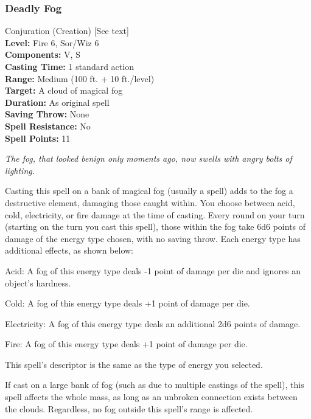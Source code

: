 \subsubsection{Deadly Fog}
\label{Spell:DeadlyFog}
Conjuration (Creation) [See text]
\\ \textbf{Level:} Fire 6, Sor/Wiz 6
\\ \textbf{Components:} V, S
\\ \textbf{Casting Time:} 1 standard action
\\ \textbf{Range:} Medium (100 ft. + 10 ft./level)
\\ \textbf{Target:} A cloud of magical fog
\\ \textbf{Duration:} As original spell
\\ \textbf{Saving Throw:} None
\\ \textbf{Spell Resistance:} No
\\ \textbf{Spell Points:} 11

\emph{The fog, that looked benign only moments ago, now swells with angry bolts of lighting.}

Casting this spell on a bank of magical fog (usually a  spell) adds to the fog a destructive element, damaging those caught within.
You choose between acid, cold, electricity, or fire damage at the time of casting. 
Every round on your turn (starting on the turn you cast this spell), 
those within the fog take 6d6 points of damage of the energy type chosen, with no saving throw.
Each energy type has additional effects, as shown below:
\begin{list}{}{\leftmargin=1em}
 \item Acid: A fog of this energy type deals -1 point of damage per die and ignores an object's hardness.
 \item Cold: A fog of this energy type deals +1 point of damage per die. 
 \item Electricity: A fog of this energy type deals an additional 2d6 points of damage.
 \item Fire: A fog of this energy type deals +1 point of damage per die.
\end{list}
This spell's descriptor is the same as the type of energy you selected.

If cast on a large bank of fog (such as due to multiple castings of the   spell), 
this spell affects the whole mass, as long as an unbroken connection exists between the clouds.
Regardless, no fog outside this spell's range is affected.

